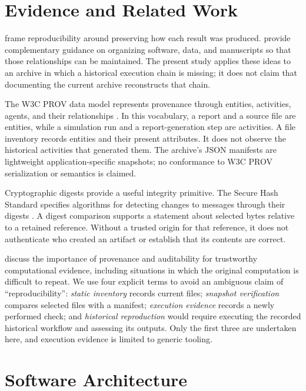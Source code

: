 \documentclass[11pt,a4paper]{article}
\begin{document}
\section{Evidence and Related Work}
\label{sec:related}
\citet{sandve2013} frame reproducibility around preserving how each result was produced. \citet{wilson2017} provide complementary guidance on organizing software, data, and manuscripts so that those relationships can be maintained. The present study applies these ideas to an archive in which a historical execution chain is missing; it does not claim that documenting the current archive reconstructs that chain.

The W3C PROV data model represents provenance through entities, activities, agents, and their relationships \citep{moreau2013}. In this vocabulary, a report and a source file are entities, while a simulation run and a report-generation step are activities. A file inventory records entities and their present attributes. It does not observe the historical activities that generated them. The archive's JSON manifests are lightweight application-specific snapshots; no conformance to W3C PROV serialization or semantics is claimed.

Cryptographic digests provide a useful integrity primitive. The Secure Hash Standard specifies algorithms for detecting changes to messages through their digests \citep{nist2015}. A digest comparison supports a statement about selected bytes relative to a retained reference. Without a trusted origin for that reference, it does not authenticate who created an artifact or establish that its contents are correct.

\citet{barba2021} discuss the importance of provenance and auditability for trustworthy computational evidence, including situations in which the original computation is difficult to repeat. We use four explicit terms to avoid an ambiguous claim of ``reproducibility'': \emph{static inventory} records current files; \emph{snapshot verification} compares selected files with a manifest; \emph{execution evidence} records a newly performed check; and \emph{historical reproduction} would require executing the recorded historical workflow and assessing its outputs. Only the first three are undertaken here, and execution evidence is limited to generic tooling.

\section{Software Architecture}
\label{sec:architecture}
\end{document}

